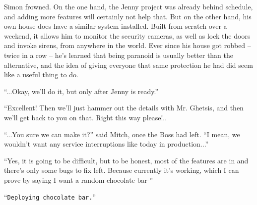 \documentclass[10pt,a4paper]{article}
\newcommand{\lang}[2]{ #2 \par}
\newcommand{\ai}[2]{
	\lang{
		-- \texttt{#1}
	}{
		``\texttt{#2}''
	}
}
\newcommand{\ainame}{Jenny}
\newcommand{\mainname}{Simon}
\newcommand{\auxname}{Mitch}
\newcommand{\policename}{Mr. Ghetsis}
\begin{document}
\lang{\mainname{} задумался. С одной стороны, проект \ainame{} уже запаздывал, а добавление большего количества функций этому точно не поможет. Но с другой стороны, у него самого похожая система есть дома. Хотя она и была собрана с нуля за одни выходные, она позволяет ему смотреть на видео с камер видеонаблюдения, а также запирать двери и включать сирены, из любой точки мира. С тех пор, как его дом обокрали -- причём дважды подряд -- он понял, что иногда быть параноиком -- лучше, чем наоборот, а идея дать всем такую же защиту, как и у него, действительно казалась полезной.}{\mainname{} frowned. On the one hand, the \ainame{} project was already behind schedule, and adding more features will certainly not help that. But on the other hand, his own house does have a similar system installed. Built from scratch over a weekend, it allows him to monitor the security cameras, as well as lock the doors and invoke sirens, from anywhere in the world. Ever since his house got robbed -- twice in a row -- he's learned that being paranoid is usually better than the alternative, and the idea of giving everyone that same protection he had did seem like a useful thing to do.}

\lang{-- ...Хорошо, мы сделаем это, но только после того, как \ainame{} будет уже в продаже.}{``...Okay, we'll do it, but only after \ainame{} is ready.''}

\lang{-- Чудесно! Тогда мы просто пока что разберёмся с деталями... Тогда давайте пройдём обратно ко мне в кабинет, сюда пожалуйста!..}{``Excellent! Then we'll just hammer out the details with \policename{}, and then we'll get back to you on that. Right this way please!..}

\lang{-- А ты уверен, что мы справимся? -- спросил \auxname{}, как только дверь за директором закрылась. ``Ведь нам таких прерываний, как сегодня, в релизе не нужно...''}{``...You sure we can make it?'' said \auxname{}, once the Boss had left. ``I mean, we wouldn't want any service interruptions like today in production...''}

\lang{-- Да, это будет сложно, но на самом-то деле большинство функций уже реализовано, и осталось только несколько багов исправить. Сейчас вот система работает, и поэтому я могу сказать, что хочу шоколадный батончик-}{``Yes, it is going to be difficult, but to be honest, most of the features are in and there's only some bugs to fix left. Because currently it's working, which I can prove by saying I want a random chocolate bar-''}

\ai{Доставляю шоколадный батончик.}{Deploying chocolate bar.}
\end{document}
